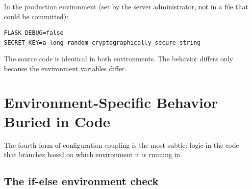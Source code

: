 \noindent{}In the production environment (set by the server administrator, not in a file that could be committed):

\begin{outputbox}[short]
\begin{Verbatim}[fontsize=\codesize, breaklines, breakanywhere, breaksymbolleft={\tiny\textcolor{muted}{$\hookrightarrow$}}]
FLASK_DEBUG=false
SECRET_KEY=a-long-random-cryptographically-secure-string
\end{Verbatim}
\end{outputbox}

\noindent{}The source code is identical in both environments. The behavior differs only because the environment variables differ.

\setcounter{section}{3}
\section{Environment-Specific Behavior Buried in Code}\label{09-configuration-coupling:94-environment-specific-behavior-buried-in-code}

The fourth form of configuration coupling is the most subtle: logic in the code that branches based on which environment it is running in.

\subsection*{The if-else environment check}\label{09-configuration-coupling:the-if-else-environment-check}

